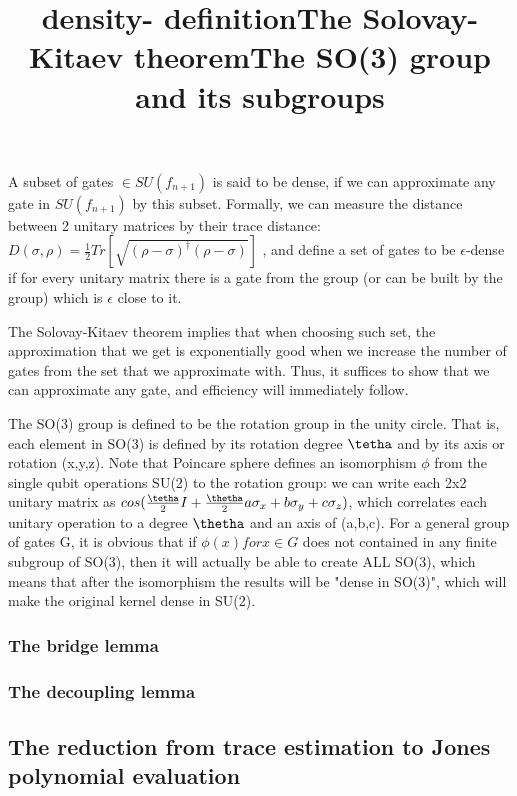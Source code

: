 \documentclass{article}
\begin{document}
\title{density- definition}
A subset of gates $\in SU(f_{n+1})$ is said to be dense, if we can approximate any gate in $ SU(f_{n+1})$ by this subset. Formally, we can measure the distance between 2 unitary matrices by their trace distance: 
$D(\sigma, \rho) = \frac{1}{2}Tr[\sqrt{(\rho - \sigma)^{\dagger}(\rho - \sigma)}]$
, and define a set of gates to be $\epsilon$-dense if for every unitary matrix there is a gate from the group (or can be built by the group) which is $\epsilon$ close to it.


\title{The Solovay-Kitaev theorem}
The Solovay-Kitaev theorem implies that when choosing such set, the approximation that we get is exponentially good when we increase the number of gates from the set that we approximate with. Thus, it suffices to show that we can approximate any gate, and efficiency will immediately follow.

\title {The SO(3) group and its subgroups}
The SO(3) group is defined to be the rotation group in the unity circle. That is, each element in SO(3) is defined by its rotation degree $\tetha$ and by its axis or rotation (x,y,z). Note that Poincare sphere defines an isomorphism $\phi$ from the single qubit operations SU(2) to the rotation group: we can write each 2x2 unitary matrix as $cos(\frac{\tetha}{2}I + \frac{\thetha}{2}{a\sigma_{x} + b\sigma_{y} + c\sigma_{z}})$, which correlates each unitary operation to a degree $\thetha$ and an axis of (a,b,c). For a general group of gates G, it is obvious that if ${\phi(x) for x \in G}$ does not contained in any finite subgroup of SO(3), then it will actually be able to create ALL SO(3), which means that after the isomorphism the results will be "dense in SO(3)", which will make the original kernel dense in SU(2).






\subsubsection{The bridge lemma}
\subsubsection{The decoupling lemma}
\subsection{The reduction from trace estimation to Jones polynomial evaluation}
\end{document}
